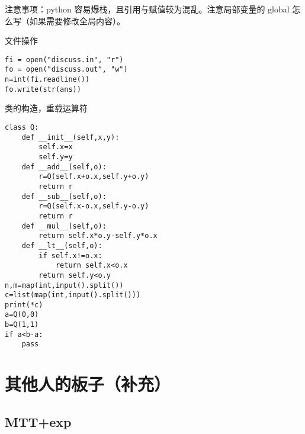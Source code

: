 \documentclass[12pt]{ctexart}
\begin{document}
注意事项：python 容易爆栈，且引用与赋值较为混乱。注意局部变量的 global 怎么写（如果需要修改全局内容）。

文件操作

\begin{lstlisting}
fi = open("discuss.in", "r")
fo = open("discuss.out", "w")
n=int(fi.readline())
fo.write(str(ans))
\end{lstlisting}


类的构造，重载运算符
\begin{lstlisting}
class Q:
	def __init__(self,x,y):
		self.x=x
		self.y=y
	def __add__(self,o):
		r=Q(self.x+o.x,self.y+o.y)
		return r
	def __sub__(self,o):
		r=Q(self.x-o.x,self.y-o.y)
		return r
	def __mul__(self,o):
		return self.x*o.y-self.y*o.x
	def __lt__(self,o):
		if self.x!=o.x:
			return self.x<o.x
		return self.y<o.y
n,m=map(int,input().split())
c=list(map(int,input().split()))
print(*c)
a=Q(0,0)
b=Q(1,1)
if a<b-a:
	pass
\end{lstlisting}

\newpage

\section{其他人的板子（补充）}

\subsection{MTT+exp}
\end{document}
